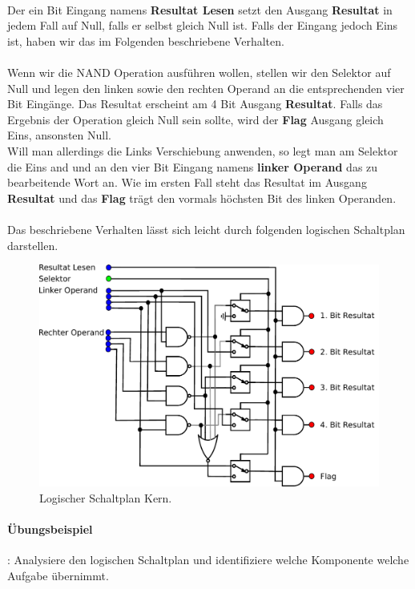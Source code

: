\documentclass[11pt,a4paper,leqno]{report}
\numberwithin{equation}{chapter}
\begin{document}
\\
Der ein Bit Eingang namens \textbf{Resultat Lesen} setzt den Ausgang \textbf{Resultat} in jedem Fall auf Null, falls er selbst gleich Null ist. Falls der Eingang jedoch Eins ist, haben wir das im Folgenden beschriebene Verhalten.\\
\\
Wenn wir die NAND Operation ausf\"uhren wollen, stellen wir den Selektor auf Null und legen den linken sowie den rechten Operand an die entsprechenden vier Bit Eing\"ange. Das Resultat erscheint am 4 Bit Ausgang \textbf{Resultat}.
Falls das Ergebnis der Operation gleich Null sein sollte, wird der \textbf{Flag} Ausgang gleich Eins, ansonsten Null.\\
Will man allerdings die Links Verschiebung anwenden, so legt man am Selektor die Eins and und an den vier Bit Eingang namens \textbf{linker Operand} das zu bearbeitende Wort an. Wie im ersten Fall steht das Resultat im Ausgang \textbf{Resultat} und das \textbf{Flag} tr\"agt den vormals h\"ochsten Bit des linken Operanden.\\
\\
Das beschriebene Verhalten l\"asst sich leicht durch folgenden logischen Schaltplan darstellen.
\begin{figure}[H]
	\begin{center}
		\includegraphics[scale=0.6]{Kern.pdf}
		\caption{Logischer Schaltplan Kern.}
	\end{center}
\end{figure}
\noindent
\paragraph{\"Ubungsbeispiel}: Analysiere den logischen Schaltplan und identifiziere welche Komponente welche Aufgabe \"ubernimmt.
\newpage
\end{document}
